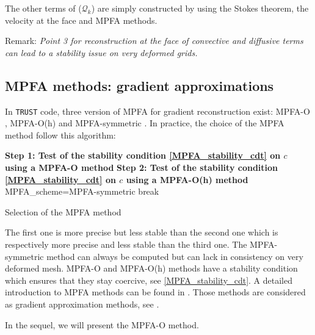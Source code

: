 The other terms of ($\mathcal{Q}_k$) are simply constructed by using the Stokes theorem, the velocity at the face and MPFA methods.

Remark: \textit{ Point 3 for reconstruction at the face of convective and diffusive terms can lead to a stability issue on very deformed grids.  } 


\subsection{MPFA methods: gradient approximations} \label{MPFA_gradient_subsec}
In \texttt{TRUST} code, three version of MPFA for gradient reconstruction exist: MPFA-O \cite{AgMa08}, MPFA-O(h) \cite{edwards1998finite} and MPFA-symmetric \cite{Lepot05}. In practice, the choice of the MPFA method follow this algorithm:

\begin{algorithm}[H]
  \SetAlgoLined
  \BlankLine
  \textbf{Step 1: Test of the stability condition \eqref{MPFA_stability_cdt} on $c$ using a MPFA-O method}\;
  \textbf{Step 2: Test of the stability condition \eqref{MPFA_stability_cdt} on $c$ using a MPFA-O(h) method}\;
    MPFA\_scheme=MPFA-symmetric\;
    break\;
  \caption{Selection of the MPFA method}
\end{algorithm}

The first one is more precise but less stable than the second one which is respectively more precise and less stable than the third one. The MPFA-symmetric method can always be computed but can lack in consistency on very deformed mesh. MPFA-O \cite{AgMa08} and MPFA-O(h) methods have a stability condition which ensures that they stay coercive, see \eqref{MPFA_stability_cdt}. 
A detailed introduction to MPFA methods can be found in \cite{droniou2014finite}. Those methods are considered as gradient approximation methods, see \cite[section 4.1]{droniou2018gradient}. 

In the sequel, we will present the MPFA-O method.

